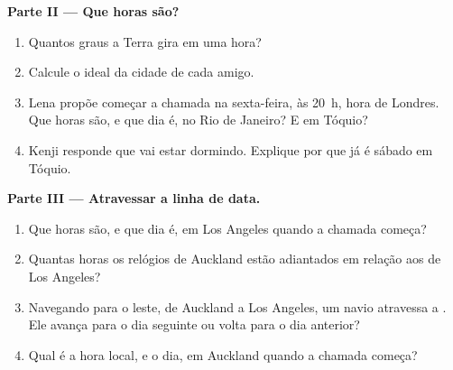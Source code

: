 \begin{problem}
\medskip
\noindent\textbf{Parte II --- Que horas são?}
\begin{enumerate}[resume]
  \item Quantos graus a Terra gira em uma hora?
  \item Calcule o  ideal da cidade de cada amigo.
  \item Lena propõe começar a chamada na sexta-feira, às 20~h, hora de
        Londres. Que horas são, e que dia é, no Rio de Janeiro? E em Tóquio?
  \item Kenji responde que vai estar dormindo. Explique por que já é
        sábado em Tóquio.
\end{enumerate}

\medskip
\noindent\textbf{Parte III --- Atravessar a linha de data.}
\begin{enumerate}[resume]
  \item Que horas são, e que dia é, em Los Angeles quando a chamada começa?
  \item Quantas horas os relógios de Auckland estão adiantados em relação
        aos de Los Angeles?
  \item Navegando para o leste, de Auckland a Los Angeles, um navio
        atravessa a . Ele avança para o dia seguinte ou volta
        para o dia anterior?
  \item Qual é a hora local, e o dia, em Auckland quando a chamada começa?
\end{enumerate}
\end{problem}
